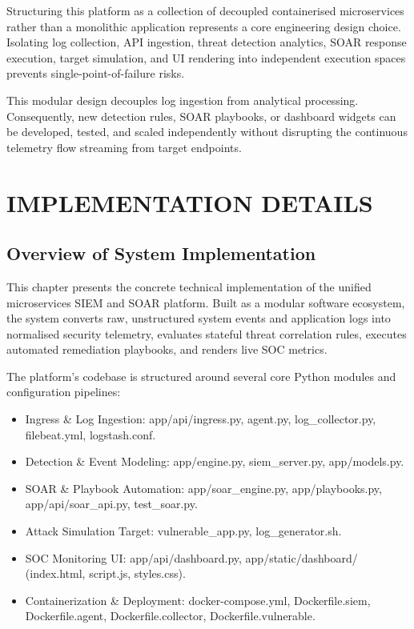 Structuring this platform as a collection of decoupled containerised microservices rather than a monolithic application represents a core engineering design choice. Isolating log collection, API ingestion, threat detection analytics, SOAR response execution, target simulation, and UI rendering into independent execution spaces prevents single-point-of-failure risks.

This modular design decouples log ingestion from analytical processing. Consequently, new detection rules, SOAR playbooks, or dashboard widgets can be developed, tested, and scaled independently without disrupting the continuous telemetry flow streaming from target endpoints.

\newpage
\chapter{IMPLEMENTATION DETAILS}

\section{Overview of System Implementation}

This chapter presents the concrete technical implementation of the unified microservices SIEM and SOAR platform. Built as a modular software ecosystem, the system converts raw, unstructured system events and application logs into normalised security telemetry, evaluates stateful threat correlation rules, executes automated remediation playbooks, and renders live SOC metrics.

The platform’s codebase is structured around several core Python modules and configuration pipelines:

\begin{itemize}
  \item Ingress \& Log Ingestion: app/api/ingress.py, agent.py, log\_collector.py, filebeat.yml, logstash.conf.
  \item Detection \& Event Modeling: app/engine.py, siem\_server.py, app/models.py.
  \item SOAR \& Playbook Automation: app/soar\_engine.py, app/playbooks.py, app/api/soar\_api.py, test\_soar.py.
  \item Attack Simulation Target: vulnerable\_app.py, log\_generator.sh.
  \item SOC Monitoring UI: app/api/dashboard.py, app/static/dashboard/ (index.html, script.js, styles.css).
  \item Containerization \& Deployment: docker-compose.yml, Dockerfile.siem, Dockerfile.agent, Dockerfile.collector, Dockerfile.vulnerable.
\end{itemize}


